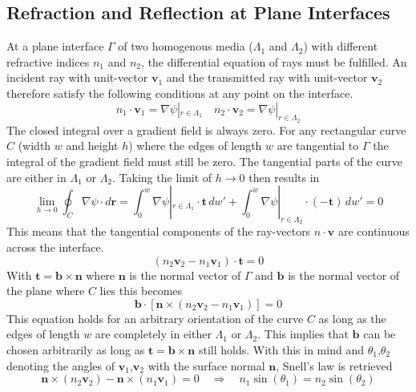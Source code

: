 \subsection{Refraction and Reflection at Plane Interfaces}
At a plane interface \(\Gamma \) of two homogenous media (\(\Lambda_1\) and \(\Lambda_2\)) with different refractive indices \(n_1\) and \(n_2\), the differential equation of rays must be fulfilled.
An incident ray with unit-vector \(\bm{v}_1\) and the transmitted ray with unit-vector \(\bm{v}_2\) therefore satisfy the following conditions at any point on the interface.
\begin{equation}
    n_1 \cdot \bm{v}_1 = \nabla \psi|_{r \in \Lambda_1 } \quad n_2 \cdot \bm{v}_2 = \nabla \psi|_{r \in \Lambda_2 } 
\end{equation}
The closed integral over a gradient field is always zero.
For any rectangular curve \(C\) (width \(w\) and height \(h\)) where the edges of length \(w\) are tangential to \(\Gamma \) the integral of the gradient field must still be zero.
The tangential parts of the curve are either in \(\Lambda_1\) or \(\Lambda_2\).
Taking the limit of \(h \to 0\) then results in~\parencite{born_foundations_1999}
\begin{equation}
    \lim_{h \to 0} \oint_C \nabla \psi \cdot d\bm{r} = \int_{0}^{w} \nabla \psi|_{r \in \Lambda_1 } \cdot \bm{t} \, dw' + \int_{0}^{w} \nabla \psi|_{r \in \Lambda_2 } \cdot (-\bm{t}) \, dw' = 0
\end{equation}
This means that the tangential components of the ray-vectors \(n \cdot \bm{v}\) are continuous across the interface.
\begin{equation}
    (n_2 \bm{v}_2 - n_1 \bm{v}_1) \cdot \bm{t} = 0
\end{equation}
With \(\bm{t} = \bm{b} \times \bm{n}\) where \(\bm{n}\) is the normal vector of \(\Gamma \) and \(\bm{b}\) is the normal vector of the plane where \(C\) lies this becomes
\begin{equation}
    \bm{b} \cdot [\bm{n} \times (n_2 \bm{v}_2 - n_1 \bm{v}_1)] = 0
\end{equation}
This equation holds for an arbitrary orientation of the curve \(C\) as long as the edges of length \(w\) are completely in either \(\Lambda_1\) or \(\Lambda_2\).
This implies that \(\bm{b}\) can be chosen arbitrarily as long as \(\bm{t} = \bm{b} \times \bm{n}\) still holds.
With this in mind and \(\theta_1\),\(\theta_2\) denoting the angles of \(\bm{v}_1\),\(\bm{v}_2\) with the surface normal \(\bm{n}\), Snell's law is retrieved
\begin{equation}
    \bm{n} \times (n_2\bm{v}_2) - \bm{n} \times (n_1\bm{v}_1) = 0 \quad \Rightarrow \quad n_1 \sin(\theta_1) = n_2 \sin(\theta_2)
\end{equation}

